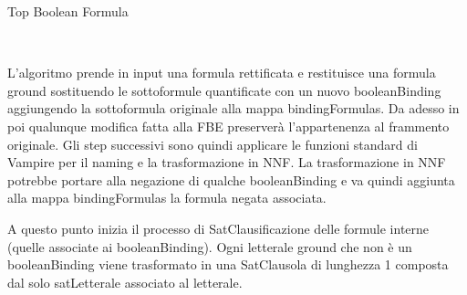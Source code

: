 \documentclass[./main.tex]{subfiles}
\begin{document}
\begin{algorithm}[H] \label{alg:topBooleanFormula}
    \caption{Top Boolean Formula}
    \\
\end{algorithm}

L'algoritmo prende in input una formula rettificata e restituisce una formula ground sostituendo le sottoformule quantificate con 
un nuovo booleanBinding aggiungendo la sottoformula originale alla mappa bindingFormulas.
Da adesso in poi qualunque modifica fatta alla FBE preserverà l'appartenenza al frammento originale.
Gli step successivi sono quindi applicare le funzioni standard di Vampire per il naming e la trasformazione in NNF.
La trasformazione in NNF potrebbe portare alla negazione di qualche booleanBinding
e va quindi aggiunta alla mappa bindingFormulas la formula negata associata.


A questo punto inizia il processo di SatClausificazione delle formule interne (quelle associate ai booleanBinding).
Ogni letterale ground che non è un booleanBinding viene trasformato in una 
SatClausola di lunghezza 1 composta dal solo satLetterale associato al letterale.

\end{document}
